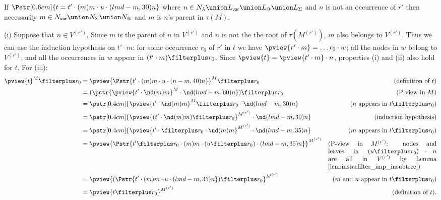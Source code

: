 \begin{compactitem}


    \item If $\Pstr[0.6cm]{ t =  t' \cdot (m){m} \cdot u \cdot (lmd-m,30){n} }$
    where $n \in N_\lambda \union L_{\sf var} \union L_@ \union
    L_\Sigma$ and $n$ is not an occurrence of $r'$ then necessarily $m\in N_{\sf var} \union
    N_\Sigma \union N_@$ and $m$ is $n$'s parent in $\tau(M)$.

    (i) Suppose that $n\in V^{(r')}$. Since $m$ is the parent of
    $n$ in $V^{(r')}$ and $n$ is not the the root of
    $\tau(M^{(r')})$, $m$ also belongs to
    $V^{(r')}$. Thus we can use the induction hypothesis on $t' \cdot m$: for some occurrence $r_0$
     of $r'$ in $t$ we have
    $\pview{r' \cdot m} = \ldots r_0 \cdot w$; all the
    nodes in $w$ belong to $V^{(r')}$; and all the
    occurrences in $w$ appear in $(t'\cdot m)\filterplus r_0$.
    Since $\pview{t}= \pview{t' \cdot m} \cdot n$, properties (i) and (ii) also hold for $t$.
    For (iii):
            \begin{align*}
            \pview{t}^M \filterplus r_0 &= \pview{\Pstr{t' \cdot (m){m} \cdot u \cdot (n-m,40){n}}}^M \filterplus r_0
                & (\mbox{definition of } t)\\
            &= (\pstr{\pview{t' \cdot \nd(m){m} }^M \cdot \nd(lmd-m,60){n}}) \filterplus r_0
                & (\mbox{P-view in $M$}) \\
            &= \pstr[0.4cm]{ \pview{t' \cdot \nd(m){m} }^M \filterplus r_0  \cdot \nd(lmd-m,30){n} }
                & (\mbox{$n$ appears in $t\filterplus r_0$}) \\
            &= \pstr[0.4cm]{ \pview{(t' \cdot \nd(m){m})\filterplus r_0}^{M^{(r')}}  \cdot  \nd(lmd-m,30){n} }
                & \mbox{(induction hypothesis)} \\
            &= \pstr[0.4cm]{ \pview{t' \cdot \filterplus r_0 \cdot \nd(m){m}}^{M^{(r')}}  \cdot  \nd(lmd-m,35){n} }
                & \mbox{($m$ appears in $t\filterplus r_0$)} \\
            &= \pview{ \Pstr{t' \filterplus r_0 \cdot (m){m} \cdot {(u \filterplus r_0)} \cdot (lmd-m,35){n}}}^{M^{(r')}}
                & \parbox[t]{6cm}{(P-view in $M^{(r')}$: nodes and leaves in $(u \filterplus r_0) \cdot n$ are all in $V^{(r')}$
                    by Lemma \ref{lem:instarfilter_imp_insubtree})} \\
            &= \pview{ (\Pstr{t' \cdot (m){m} \cdot u \cdot (lmd-m,35){n}}) \filterplus r_0 }^{M^{(r')}}
                & (\mbox{$m$ and $n$ appear in $t\filterplus r_0$}) \\
            &= \pview{ t \filterplus r_0 }^{M^{(r')}}
                & \mbox{(definition of $t$).}
            \end{align*}


\end{compactitem}

